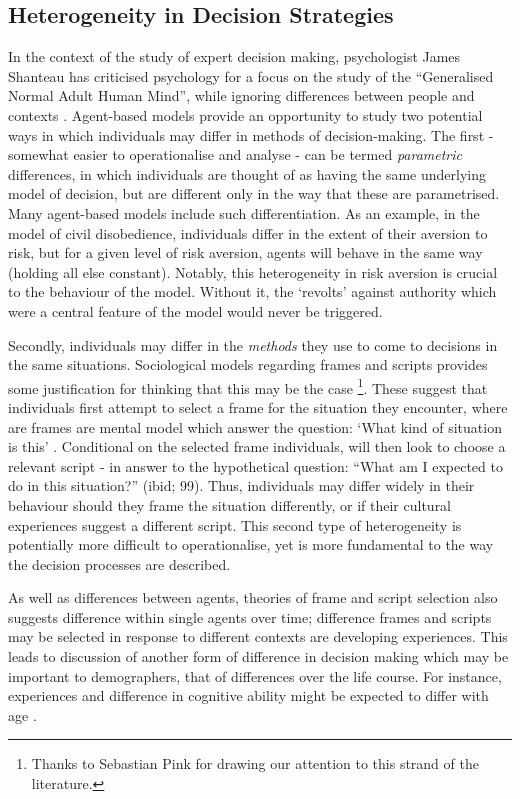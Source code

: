 \documentclass{article}
\begin{document}
\subsection{Heterogeneity in Decision
Strategies}\label{heterogeneity-in-decision-strategies}

In the context of the study of expert decision making, psychologist
James Shanteau has criticised psychology for a focus on the study of the
``Generalised Normal Adult Human Mind'', while ignoring differences
between people and contexts \citep{Shanteau2015}. Agent-based models
provide an opportunity to study two potential ways in which individuals
may differ in methods of decision-making. The first - somewhat easier to operationalise and analyse - can be termed
\emph{parametric} differences, in which individuals are thought of as
having the same underlying model of decision, but are different only in
the way that these are parametrised. Many agent-based models include
such differentiation. As an example, in the \citet{Epstein2002} model of
civil disobedience, individuals differ in the extent of their aversion
to risk, but for a given level of risk aversion, agents will behave in
the same way (holding all else constant). Notably, this heterogeneity in
risk aversion is crucial to the behaviour of the model. Without it, the
`revolts' against authority which were a central feature of the model
would never be triggered.

Secondly, individuals may differ in the \emph{methods} they use to come
to decisions in the same situations. Sociological models regarding
frames and scripts provides some justification for thinking that this
may be the case \citep{Kronenberg2014}\footnote{Thanks to Sebastian
  Pink for drawing our attention to this strand of the literature.}.
These suggest that individuals first attempt to select a frame for the
situation they encounter, where are frames are mental model which answer
the question: `What kind of situation is this' . Conditional on the
selected frame individuals, will then look to choose a relevant script -
in answer to the hypothetical question: ``What am I expected to do in
this situation?'' (ibid; 99). Thus, individuals may differ widely in
their behaviour should they frame the situation differently, or if their
cultural experiences suggest a different script.  This second type of heterogeneity is potentially more difficult to operationalise, yet is more fundamental to the way the decision processes are described.

As well as differences between agents, theories of frame and script
selection also suggests difference within single agents over time;
difference frames and scripts may be selected in response to different
contexts are developing experiences. This leads to discussion of another
form of difference in decision making which may be important to
demographers, that of differences over the life course. For instance,
experiences and difference in cognitive ability might be expected to
differ with age \citep{DeBruin2015}.
\end{document}
